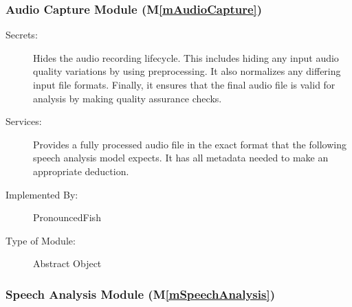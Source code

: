 \documentclass[12pt, titlepage]{article}
\newcommand{\mref}[1]{M\ref{#1}}
\begin{document}
\subsubsection{Audio Capture Module (\mref{mAudioCapture})}

\begin{description}
\item[Secrets:]Hides the audio recording lifecycle. This includes hiding any input audio quality variations by using preprocessing. It also normalizes any differing input file formats. Finally, it ensures that the final audio file is valid for analysis by making quality assurance checks.  
\item[Services:]Provides a fully processed audio file in the exact format that the following speech analysis model expects. It has all metadata needed to make an appropriate deduction. 
\item[Implemented By:] PronouncedFish
\item[Type of Module:] Abstract Object
\end{description}

\subsubsection{Speech Analysis Module (\mref{mSpeechAnalysis})}
\end{document}
